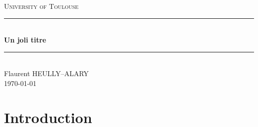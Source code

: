 \documentclass[12pt]{report}
\numberwithin{equation}{section}
\newcommand{\noun}[1]{\textsc{#1}}
\begin{document}

\begin{titlepage}
\newcommand{\HRule}{\rule{\linewidth}{0.5mm}}
\center
\textsc{\LARGE
	University of Toulouse
} \\[1cm]
\HRule\\[0.4cm]
{ \huge \bfseries Un joli titre \\[0.15cm] }
\HRule\\[1.5cm]
Flaurent HEULLY--ALARY
\\[1cm]
\today \\ [1cm]
\end{titlepage}
\begin{center}
\thispagestyle{plain}
\par\end{center}
\large
\tableofcontents
\newpage
\thispagestyle{empty}
\listoffigures
\listoftables
\newpage

\chapter{Introduction}
\end{document}
